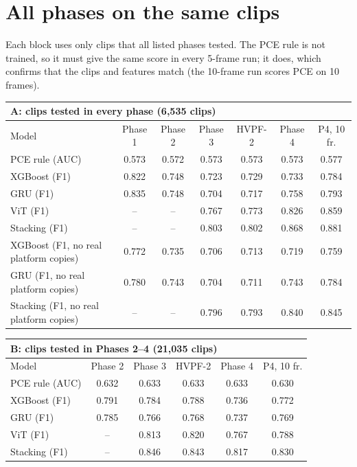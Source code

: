 \documentclass[11pt,a4paper]{article}
\begin{document}
\section{All phases on the same clips}
Each block uses only clips that all listed phases tested. The PCE rule is not trained, so it must give the same score in every 5-frame run; it does, which confirms that the clips and features match (the 10-frame run scores PCE on 10 frames).
\begin{table}[H]\centering\small\setlength{\tabcolsep}{4pt}\begin{tabular}{lcccccc}\toprule \multicolumn{7}{l}{\textbf{A: clips tested in every phase} (6,535 clips)} \\\midrule Model & Phase 1 & Phase 2 & Phase 3 & HVPF-2 & Phase 4 & P4, 10 fr. \\\midrule
PCE rule (AUC) & 0.573 & 0.572 & 0.573 & 0.573 & 0.573 & 0.577 \\
XGBoost (F1) & 0.822 & 0.748 & 0.723 & 0.729 & 0.733 & 0.784 \\
GRU (F1) & 0.835 & 0.748 & 0.704 & 0.717 & 0.758 & 0.793 \\
ViT (F1) & -- & -- & 0.767 & 0.773 & 0.826 & 0.859 \\
Stacking (F1) & -- & -- & 0.803 & 0.802 & 0.868 & 0.881 \\
XGBoost (F1, no real platform copies) & 0.772 & 0.735 & 0.706 & 0.713 & 0.719 & 0.759 \\
GRU (F1, no real platform copies) & 0.780 & 0.743 & 0.704 & 0.711 & 0.743 & 0.784 \\
Stacking (F1, no real platform copies) & -- & -- & 0.796 & 0.793 & 0.840 & 0.845 \\
\bottomrule\end{tabular}\end{table}
\begin{table}[H]\centering\small\setlength{\tabcolsep}{4pt}\begin{tabular}{lccccc}\toprule \multicolumn{6}{l}{\textbf{B: clips tested in Phases 2--4} (21,035 clips)} \\\midrule Model & Phase 2 & Phase 3 & HVPF-2 & Phase 4 & P4, 10 fr. \\\midrule
PCE rule (AUC) & 0.632 & 0.633 & 0.633 & 0.633 & 0.630 \\
XGBoost (F1) & 0.791 & 0.784 & 0.788 & 0.736 & 0.772 \\
GRU (F1) & 0.785 & 0.766 & 0.768 & 0.737 & 0.769 \\
ViT (F1) & -- & 0.813 & 0.820 & 0.767 & 0.788 \\
Stacking (F1) & -- & 0.846 & 0.843 & 0.817 & 0.830 \\
\bottomrule\end{tabular}\end{table}
\end{document}
